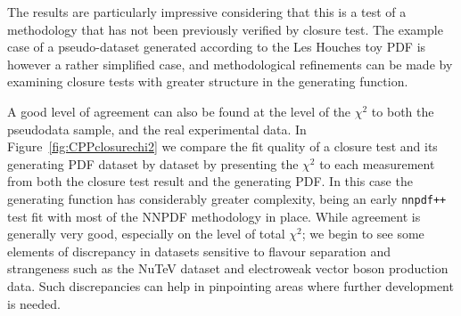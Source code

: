 The results are particularly impressive considering that this is a test of a methodology that has not been previously verified by closure test. The example case of a pseudo-dataset generated according to the Les Houches toy PDF is however a rather simplified case, and methodological refinements can be made by examining closure tests with greater structure in the generating function.

A good level of agreement can also be found at the level of the $\chi^2$ to both the pseudodata sample, and the real experimental data. In Figure~\ref{fig:CPPclosurechi2} we compare the fit quality of a closure test and its generating PDF dataset by dataset by presenting the $\chi^2$ to each measurement from both the closure test result and the generating PDF. In this case the generating function has considerably greater complexity, being an early {\tt nnpdf++} test fit with most of the NNPDF methodology in place. While agreement is generally very good, especially on the level of total $\chi^2$; we begin to see some elements of discrepancy in datasets sensitive to flavour separation and strangeness such as the NuTeV dataset and electroweak vector boson production data. Such discrepancies can help in pinpointing areas where further development is needed.

